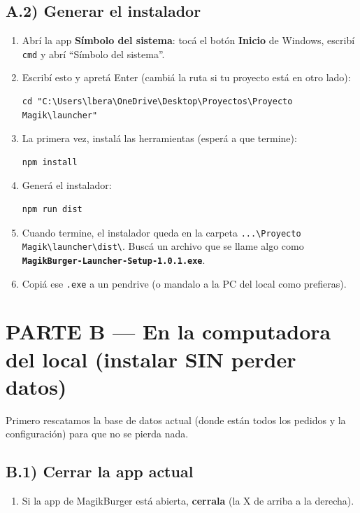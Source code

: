\documentclass[11pt,a4paper]{article}
\newcommand{\rut}[1]{\texttt{#1}}
\newcommand{\bs}{\textbackslash{}}
\begin{document}
\subsection*{A.2) Generar el instalador}
\begin{enumerate}
  \item Abrí la app \textbf{Símbolo del sistema}: tocá el botón \textbf{Inicio} de Windows,
        escribí \rut{cmd} y abrí ``Símbolo del sistema''.
  \item Escribí esto y apretá Enter (cambiá la ruta si tu proyecto está en otro lado):
\begin{lstlisting}
cd "C:\Users\lbera\OneDrive\Desktop\Proyectos\Proyecto Magik\launcher"
\end{lstlisting}
  \item La primera vez, instalá las herramientas (esperá a que termine):
\begin{lstlisting}
npm install
\end{lstlisting}
  \item Generá el instalador:
\begin{lstlisting}
npm run dist
\end{lstlisting}
  \item Cuando termine, el instalador queda en la carpeta
        \rut{...\bs Proyecto Magik\bs launcher\bs dist\bs}.
        Buscá un archivo que se llame algo como
        \textbf{\rut{MagikBurger-Launcher-Setup-1.0.1.exe}}.
  \item Copiá ese \rut{.exe} a un pendrive (o mandalo a la PC del local como prefieras).
\end{enumerate}

\section*{PARTE B --- En la computadora del local (instalar SIN perder datos)}

\begin{importante}
Primero rescatamos la base de datos actual (donde están todos los pedidos y la
configuración) para que no se pierda nada.
\end{importante}

\subsection*{B.1) Cerrar la app actual}
\begin{enumerate}
  \item Si la app de MagikBurger está abierta, \textbf{cerrala} (la X de arriba a la derecha).
\end{enumerate}
\end{document}

